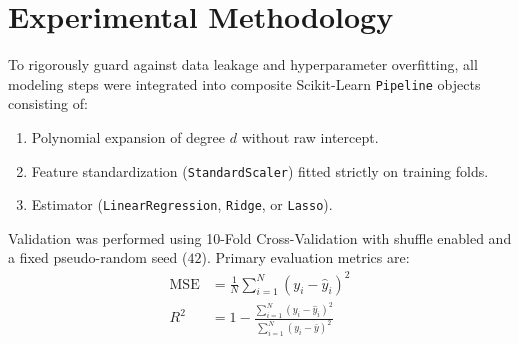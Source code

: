 \documentclass[10pt,twocolumn]{article}
\begin{document}
\section{Experimental Methodology}
To rigorously guard against data leakage and hyperparameter overfitting, all modeling steps were integrated into composite Scikit-Learn \texttt{Pipeline} objects consisting of:
\begin{enumerate}\setlength{\itemsep}{1pt}
    \item Polynomial expansion of degree $d$ without raw intercept.
    \item Feature standardization (\texttt{StandardScaler}) fitted strictly on training folds.
    \item Estimator (\texttt{LinearRegression}, \texttt{Ridge}, or \texttt{Lasso}).
\end{enumerate}

Validation was performed using 10-Fold Cross-Validation with shuffle enabled and a fixed pseudo-random seed ($42$). Primary evaluation metrics are:
\begin{align}
\text{MSE} &= \frac{1}{N} \sum_{i=1}^N (y_i - \hat{y}_i)^2 \\
R^2 &= 1 - \frac{\sum_{i=1}^N (y_i - \hat{y}_i)^2}{\sum_{i=1}^N (y_i - \bar{y})^2}
\end{align}

\begin{table}[h]
\centering
\caption{\textbf{Phase 1 (var1): Performance across Polynomial Degrees (10-Fold CV)}}
\label{tab:var1_perf}
\end{table}
\end{document}
